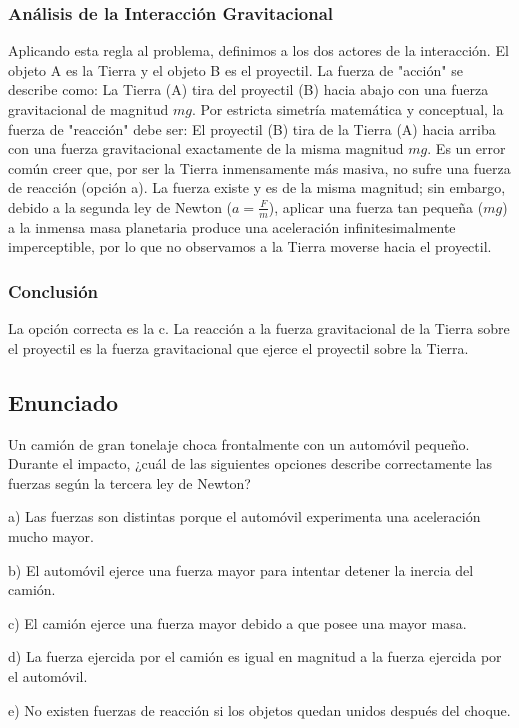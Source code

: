 \documentclass[12pt]{article}
\begin{document}
\subsubsection*{Análisis de la Interacción Gravitacional}
Aplicando esta regla al problema, definimos a los dos actores de la interacción. El objeto A es la Tierra y el objeto B es el proyectil. 
La fuerza de "acción" se describe como: La Tierra (A) tira del proyectil (B) hacia abajo con una fuerza gravitacional de magnitud $mg$.
Por estricta simetría matemática y conceptual, la fuerza de "reacción" debe ser: El proyectil (B) tira de la Tierra (A) hacia arriba con una fuerza gravitacional exactamente de la misma magnitud $mg$.
Es un error común creer que, por ser la Tierra inmensamente más masiva, no sufre una fuerza de reacción (opción a). La fuerza existe y es de la misma magnitud; sin embargo, debido a la segunda ley de Newton ($a = \frac{F}{m}$), aplicar una fuerza tan pequeña ($mg$) a la inmensa masa planetaria produce una aceleración infinitesimalmente imperceptible, por lo que no observamos a la Tierra moverse hacia el proyectil.

\subsubsection*{Conclusión}
La opción correcta es la c. La reacción a la fuerza gravitacional de la Tierra sobre el proyectil es la fuerza gravitacional que ejerce el proyectil sobre la Tierra.

\newpage
\subsection*{Enunciado}
Un camión de gran tonelaje choca frontalmente con un automóvil pequeño. Durante el impacto, ¿cuál de las siguientes opciones describe correctamente las fuerzas según la tercera ley de Newton?

a) Las fuerzas son distintas porque el automóvil experimenta una aceleración mucho mayor.

b) El automóvil ejerce una fuerza mayor para intentar detener la inercia del camión.

c) El camión ejerce una fuerza mayor debido a que posee una mayor masa.

d) La fuerza ejercida por el camión es igual en magnitud a la fuerza ejercida por el automóvil.

e) No existen fuerzas de reacción si los objetos quedan unidos después del choque.
\end{document}
